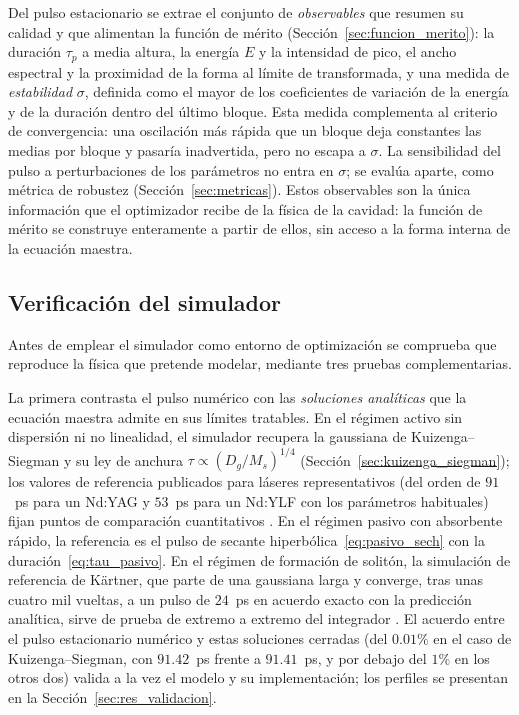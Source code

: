 Del pulso estacionario se extrae el conjunto de \emph{observables} que resumen su
calidad y que alimentan la función de mérito (Sección~\ref{sec:funcion_merito}): la
duración $\tau_p$ a media altura, la energía $E$ y la intensidad de pico, el ancho
espectral y la proximidad de la forma al límite de transformada, y una medida de
\emph{estabilidad} $\sigma$, definida como el mayor de los coeficientes de variación de
la energía y de la duración dentro del último bloque. Esta medida complementa al
criterio de convergencia: una oscilación más rápida que un bloque deja constantes las
medias por bloque y pasaría inadvertida, pero no escapa a $\sigma$. La sensibilidad del
pulso a perturbaciones de los parámetros no entra en $\sigma$; se evalúa aparte, como
métrica de robustez (Sección~\ref{sec:metricas}). Estos
observables son la única información que el optimizador recibe de la física de la
cavidad: la función de mérito se construye enteramente a partir de ellos, sin acceso
a la forma interna de la ecuación maestra.

\subsection{Verificación del simulador}
\label{sec:sim_verificacion}

Antes de emplear el simulador como entorno de optimización se comprueba que
reproduce la física que pretende modelar, mediante tres pruebas complementarias.

La primera contrasta el pulso numérico con las \emph{soluciones analíticas} que la
ecuación maestra admite en sus límites tratables. En el régimen activo sin
dispersión ni no linealidad, el simulador recupera la gaussiana de
Kuizenga--Siegman y su ley de anchura $\tau\propto(D_g/M_s)^{1/4}$
(Sección~\ref{sec:kuizenga_siegman}); los valores de referencia publicados para
láseres representativos (del orden de $91$~ps para un Nd:YAG y $53$~ps para un
Nd:YLF con los parámetros habituales) fijan puntos de comparación cuantitativos
\cite{Keller2022}. En el régimen pasivo con absorbente rápido, la referencia es el
pulso de secante hiperbólica~\eqref{eq:pasivo_sech} con la
duración~\eqref{eq:tau_pasivo}. En el régimen de formación de solitón, la simulación
de referencia de Kärtner, que parte de una gaussiana larga y converge, tras unas
cuatro mil vueltas, a un pulso de $24$~ps en acuerdo exacto con la predicción
analítica, sirve de prueba de extremo a extremo del integrador
\cite{Kaertner2020}. El acuerdo entre el pulso estacionario numérico y estas
soluciones cerradas (del $0.01\%$ en el caso de Kuizenga--Siegman, con $91.42$~ps
frente a $91.41$~ps, y por debajo del $1\%$ en los otros dos) valida a la vez el modelo
y su implementación; los perfiles se presentan en la Sección~\ref{sec:res_validacion}.


